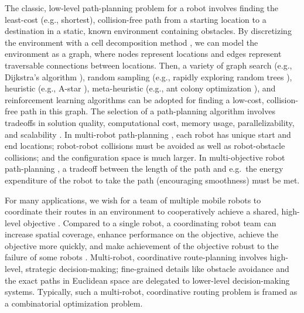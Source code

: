 \documentclass[fleqn,10pt,lineno]{wlpeerj}
\begin{document}
The classic, low-level path-planning problem for a robot \cite{lavalle2006planning,agrawal2022classical} involves finding the least-cost (e.g., shortest), collision-free path from a starting location to a destination in a static, known environment containing obstacles.
By discretizing the environment with a cell decomposition method \cite{latombe2012robot}, we can model the environment as a graph, where nodes represent locations and edges represent traversable connections between locations. Then, a variety of graph search (e.g., Dijkstra's algorithm \cite{candra2020dijkstra}), random sampling (e.g., rapidly exploring random trees \cite{lavalle1998rapidly}), heuristic (e.g., A-star \cite{candra2020dijkstra}), meta-heuristic (e.g., ant colony optimization \cite{brand2010ant}), and reinforcement learning \cite{singh2023review} algorithms can be adopted for finding a low-cost, collision-free path in this graph. 
The selection of a path-planning algorithm involves tradeoffs in solution quality, computational cost, memory usage, parallelizability, and scalability \cite{ugwoke2025simulation}.
In multi-robot path-planning \cite{wagner2011m}, each robot has unique start and end locations; robot-robot collisions must be avoided as well as robot-obstacle collisions; and the configuration space is much larger.
In multi-objective robot path-planning \cite{tarbouriech2020bi,jimenez2024exploring,ntakolia2022comparative,dao2016multi,thammachantuek2022path}, a tradeoff between the length of the path and e.g.\ the energy expenditure of the robot to take the path (encouraging smoothness) must be met.

For many applications, we wish for a team of multiple mobile robots to coordinate their routes in an environment to cooperatively achieve a shared, high-level objective \cite{parker1995design,parker2007distributed}. 
Compared to a single robot, a coordinating robot team can increase spatial coverage, enhance performance on the objective, achieve the objective more quickly, and make achievement of the objective robust to the failure of some robots \cite{schranz2020swarm,brambilla2013swarm}.
Multi-robot, coordinative route-planning involves high-level, strategic decision-making; fine-grained details like obstacle avoidance and the exact paths in Euclidean space are delegated to lower-level decision-making systems. 
Typically, such a multi-robot, coordinative routing problem is framed as a combinatorial optimization problem.
\end{document}
